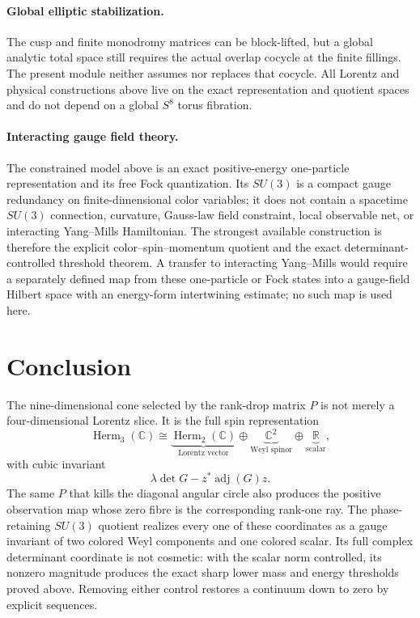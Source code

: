 \documentclass[11pt]{article}
\theoremstyle{definition}
\newcommand{\C}{\mathbb C}
\newcommand{\R}{\mathbb R}
\newcommand{\Herm}{\operatorname{Herm}}
\newcommand{\adj}{\operatorname{adj}}
\begin{document}
\paragraph{Global elliptic stabilization.}
The cusp and finite monodromy matrices can be block-lifted, but a global analytic total space still requires the actual overlap cocycle at the finite fillings.  The present module neither assumes nor replaces that cocycle.  All Lorentz and physical constructions above live on the exact representation and quotient spaces and do not depend on a global $S^8$ torus fibration.

\paragraph{Interacting gauge field theory.}
The constrained model above is an exact positive-energy one-particle representation and its free Fock quantization.  Its $SU(3)$ is a compact gauge redundancy on finite-dimensional color variables; it does not contain a spacetime $SU(3)$ connection, curvature, Gauss-law field constraint, local observable net, or interacting Yang--Mills Hamiltonian.  The strongest available construction is therefore the explicit color--spin--momentum quotient and the exact determinant-controlled threshold theorem.  A transfer to interacting Yang--Mills would require a separately defined map from these one-particle or Fock states into a gauge-field Hilbert space with an energy-form intertwining estimate; no such map is used here.

\section{Conclusion}

The nine-dimensional cone selected by the rank-drop matrix $P$ is not merely a four-dimensional Lorentz slice.  It is the full spin representation
\[
 \Herm_3(\C)
 \cong
 \underbrace{\Herm_2(\C)}_{\text{Lorentz vector}}
 \oplus
 \underbrace{\C^2}_{\text{Weyl spinor}}
 \oplus
 \underbrace{\R}_{\text{scalar}},
\]
with cubic invariant
\[
 \lambda\det G-z^*\adj(G)z.
\]
The same $P$ that kills the diagonal angular circle also produces the positive observation map whose zero fibre is the corresponding rank-one ray.  The phase-retaining $SU(3)$ quotient realizes every one of these coordinates as a gauge invariant of two colored Weyl components and one colored scalar.  Its full complex determinant coordinate is not cosmetic: with the scalar norm controlled, its nonzero magnitude produces the exact sharp lower mass and energy thresholds proved above.  Removing either control restores a continuum down to zero by explicit sequences.
\end{document}
